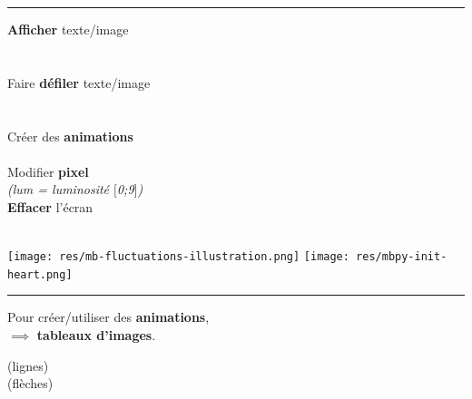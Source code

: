 \begin{minipage}[t]{0.6\linewidth}
	\begin{methode}[LED \mb]
		\rule{-0.25em}{2em}
		\textbf{Afficher} texte/image
		\hfill {}\\
		~\hfill \ex {}\\
		~\hfill \ex {}\\
		
		Faire \textbf{défiler} texte/image
		\hfill {}\\
		~\hfill \ex {}\\
		~\hfill \ex {}\\
		
		Créer des \textbf{animations}
		\hfill {}\\
		~\hfill \ex{}\\
		
		Modifier \textbf{pixel}
		\hfill {}\\
		\textit{\footnotesize (lum = luminosité $[$0;9$]$)}
		\hfill \ex {}\\
		
		\textbf{Effacer} l'écran
		\hfill {}\\
	\end{methode}
\end{minipage}
\hfill
\begin{minipage}[t]{0.4\linewidth}~\\[1.5em]
\hfill
\texttt{[image: res/mb-fluctuations-illustration.png]}
\hfill
\texttt{[image: res/mbpy-init-heart.png]}
\hfill~
\\[0em]
\begin{remarque}
	\rule{-0.25em}{1.7em}
	\hfill Pour créer/utiliser des \textbf{animations},\\
	\hfill $\implies$ \textbf{tableaux d'images}.
	
	\ex {} (lignes)\\
	\ex {} (flèches)\\
\end{remarque}	
\end{minipage}

